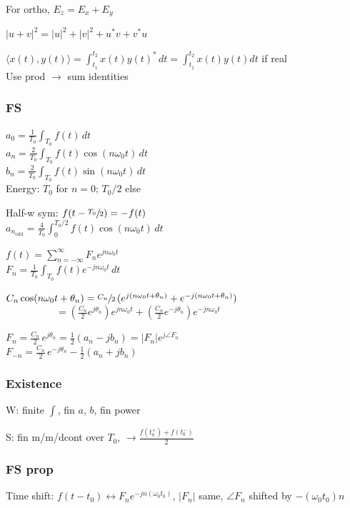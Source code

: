 \documentclass[4pt]{article}
\theoremstyle{definition}
\theoremstyle{definition}
\renewcommand{\o}{\omega}
\newcommand{\ra}{\rightarrow}
\newcommand{\lra}{\leftrightarrow}
\begin{document}
\begin{landscape}
\begin{multicols}{3}
    For ortho, $E_z = E_x + E_y$
        

    $|u+v|^2 = |u|^2 + |v|^2 + u^*v + v^*u$

    $\langle x(t), y(t)\rangle = \int_{t_1}^{t_2} x(t) y(t)^* \, dt = \int_{t_1}^{t_2} x(t) y(t) dt$ if real\\
    Use prod $\ra$ sum identities
\newpage
\subsubsection*{FS}
    $a_0 = \frac{1}{T_0} \int_{T_0} f(t)\, dt$\\
    $a_n = \frac{2}{T_0} \int_{T_0} f(t) \cos(n\o_0t)\,dt$\\
    $b_n = \frac{2}{T_0} \int_{T_0} f(t) \sin(n\o_0t)\,dt$\\
    Energy: $T_0$ for $n=0$; $T_0/2$ else
     
    Half-w sym: $f(t - \sfrac{T_0}{2}) = -f(t)$\\
    $a_{n_\mathrm{odd}} = \frac{4}{T_0}\int_{0}^{T_0/2} f(t) \cos (n\o_0 t) \, dt$

    $f(t) = \sum_{n=-\infty}^{\infty} F_n e^{jn\o_0 t}$\\
    $F_n = \frac{1}{T_0}\int_{T_0} f(t) e^{-jn\o_0t}\,dt$

    $C_n\cos(n\o_0 t + \theta_n) = \sfrac{C_n}{2} \, (e^{j(n\o_0t + \theta_n)} + e^{-j(n\o_0 t + \theta_n)})$\\
    $ \hspace{5em}= (\frac{C_n} 2 e^{j\theta_n}) e^{jn\o_0 t} + (\frac{C_n} 2 e^{-j\theta_n}) e^{-jn\o_0 t}$

    $F_n = \frac{C_n}{2}\, e^{j\theta_n} = \frac 1 2 (a_n - jb_n) = |F_n| e^{j\angle F_n}$\\
    $F_{-n} = \frac{C_n}{2}\, e^{-j\theta_n} - \frac 1 2 (a_n + jb_n)$  %
\subsubsection*{Existence}
    W: finite $\int$, fin $a$, $b$, fin power

    S: fin m/m/dcont over $T_0$, $\ra \frac{f(t_0^+) + f(t_0^-)}{2}$
\subsubsection*{FS prop}
    Time shift: $f(t-t_0)\lra F_n e^{-jn(\o_0 t_0)}$, $|F_n|$ same, $\angle F_n$ shifted by $-(\o_0 t_0)n$


\end{multicols}
\end{landscape}
\end{document}
